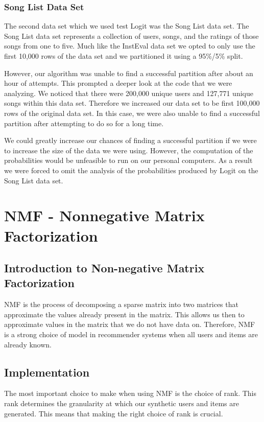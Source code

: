 \documentclass{article}
\begin{document}
\subsubsection{Song List Data Set}
The second data set which we used test Logit was the Song List data set. The Song List data set represents a collection of users, songs, and the ratings of those songs from one to five. Much like the InstEval data set we opted to only use the first 10,000 rows of the data set and we partitioned it using a 95\%/5\% split. 

However, our algorithm was unable to find a successful partition after about an hour of attempts. This prompted a deeper look at the code that we were analyzing. We noticed that there were 200,000 unique users and 127,771 unique songs within this data set. Therefore we increased our data set to be first 100,000 rows of the original data set. In this case, we were also unable to find a successful partition after attempting to do so for a long time. 

We could greatly increase our chances of finding a successful partition if we were to increase the size of the data we were using. However, the computation of the probabilities would be unfeasible to run on our personal computers. As a result we were forced to omit the analysis of the probabilities produced by Logit on the Song List data set. 


\section{NMF - Nonnegative Matrix Factorization}

\subsection{Introduction to Non-negative Matrix Factorization}

NMF is the process of decomposing a sparse matrix into two matrices that approximate the values already present in the matrix. This allows us then to approximate values in the matrix that we do not have data on. Therefore, NMF is a strong choice of model in recommender systems when all users and items are already known.

\subsection{Implementation}

The most important choice to make when using NMF is the choice of rank. This rank determines the granularity at which our synthetic users and items are generated. This means that making the right choice of rank is crucial. 
\end{document}
